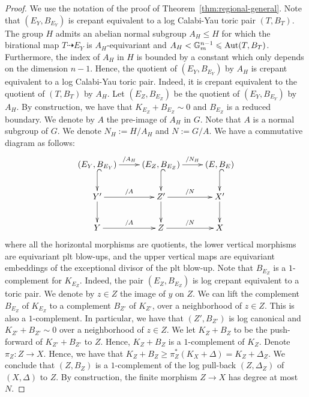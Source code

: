 \documentclass{amsart}
\theoremstyle{remark}
\numberwithin{equation}{section}
\begin{document}
\begin{proof}
We use the notation of the proof of Theorem~\ref{thm:regional-general}.
Note that $(E_Y,B_{E_Y})$ is crepant equivalent  to a log Calabi-Yau 
toric pair $(T,B_T)$.
The group $H$ admits an abelian normal subgroup $A_H\leqslant H$
for which the birational map $T\dashrightarrow E_Y$ is $A_H$-equivariant and $A_H<\mathbb{G}_m^{n-1}\leqslant {\rm Aut}(T,B_T)$.
Furthermore, the index of $A_H$ in $H$ is bounded by a constant
which only depends on the dimension $n-1$.
Hence, the quotient of $(E_Y,B_{E_Y})$ by $A_H$
is crepant equivalent  to a log Calabi-Yau toric pair.
Indeed, it is crepant
equivalent to the quotient
of $(T,B_T)$ by $A_H$.
Let $(E_{Z},B_{E_{Z}})$ be the quotient of $(E_Y,B_{E_Y})$ by $A_H$.
By construction, we have that
$K_{E_Z}+B_{E_Z}\sim 0$ and
$B_{E_Z}$ is a reduced boundary.
We denote by $A$ the pre-image of $A_H$ in $G$.
Note that $A$ is a normal subgroup of $G$.
We denote $N_H:=H/A_H$ and $N:=G/A$.
We have a commutative diagram as follows:
\[ 
\xymatrix{
(E_Y,B_{E_Y}) \ar[r]^-{/A_H}\ar@{^{(}->}[d] & (E_Z,B_{E_Z}) \ar@{^{(}->}[d] \ar[r]^-{/N_H} & (E,B_E) \ar@{^{(}->}[d] \\
Y'\ar[d]\ar[r]^-{/A} & Z' \ar[d]\ar[r]^-{/N} & X'\ar[d] \\
Y\ar[r]^-{/A} & Z \ar[r]^-{/N} & X
}
\]
where all the horizontal morphisms are quotients, the lower vertical morphisms are equivariant plt blow-ups, 
and the upper vertical maps are equivariant embeddings of
the exceptional divisor of the plt blow-up.
Note that $B_{E_Z}$ is a $1$-complement for $K_{E_Z}$.
Indeed, the pair
$(E_Z,B_{E_Z})$ is log crepant equivalent to a toric pair.
We denote by $z\in Z$ the image of $y$ on $Z$.
We can lift the complement $B_{E_{Z}}$ of $K_{E_{Z}}$ to a complement 
$B_{Z'}$ of 
$K_{Z'}$,
over a neighborhood of $z\in Z$.
This is also a $1$-complement.
In particular, we have that
$(Z',B_{Z'})$ is log canonical and
$K_{Z'}+B_{Z'}\sim 0$
over a neighborhood of $z\in Z$.
We let $K_Z+B_Z$ to be the push-forward of
$K_{Z'}+B_{Z'}$ to $Z$.
Hence, $K_Z+B_Z$ is a $1$-complement of $K_Z$.
Denote $\pi_Z\colon Z\rightarrow X$.
Hence, we have that
$K_Z+B_Z\geq \pi_Z^*(K_X+\Delta)=K_Z+\Delta_Z$.
We conclude that $(Z,B_Z)$
is a $1$-complement
of the log pull-back 
$(Z,\Delta_Z)$ of $(X,\Delta)$ to $Z$.
By construction,
the finite morphism
$Z\rightarrow X$ has degree at most $N$.


\end{proof}
\end{document}
